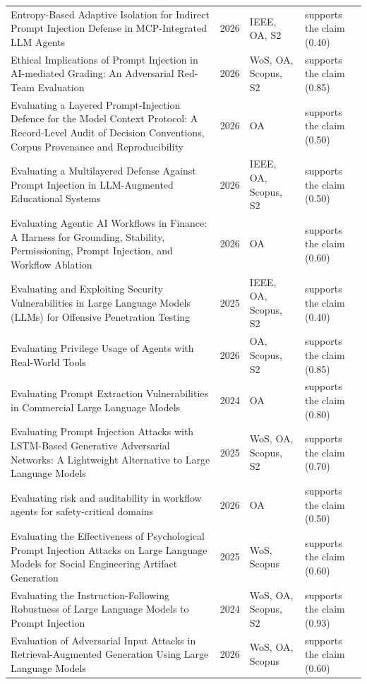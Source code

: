 \begin{longtable}{@{}%
  >{\raggedright\arraybackslash}p{}c%
  >{\raggedright\arraybackslash}p{}%
  >{\raggedright\arraybackslash}p{}@{}}
Entropy-Based Adaptive Isolation for Indirect Prompt Injection Defense in MCP-Integrated LLM Agents & 2026 & IEEE, OA, S2 & supports the claim (0.40) \\
Ethical Implications of Prompt Injection in AI-mediated Grading: An Adversarial Red-Team Evaluation & 2026 & WoS, OA, Scopus, S2 & supports the claim (0.85) \\
Evaluating a Layered Prompt-Injection Defence for the Model Context Protocol: A Record-Level Audit of Decision Conventions, Corpus Provenance and Reproducibility & 2026 & OA & supports the claim (0.50) \\
Evaluating a Multilayered Defense Against Prompt Injection in LLM-Augmented Educational Systems & 2026 & IEEE, OA, Scopus, S2 & supports the claim (0.50) \\
Evaluating Agentic AI Workflows in Finance: A Harness for Grounding, Stability, Permissioning, Prompt Injection, and Workflow Ablation & 2026 & OA & supports the claim (0.60) \\
Evaluating and Exploiting Security Vulnerabilities in Large Language Models (LLMs) for Offensive Penetration Testing & 2025 & IEEE, OA, Scopus, S2 & supports the claim (0.40) \\
Evaluating Privilege Usage of Agents with Real-World Tools & 2026 & OA, Scopus, S2 & supports the claim (0.85) \\
Evaluating Prompt Extraction Vulnerabilities in Commercial Large Language Models & 2024 & OA & supports the claim (0.80) \\
Evaluating Prompt Injection Attacks with LSTM-Based Generative Adversarial Networks: A Lightweight Alternative to Large Language Models & 2025 & WoS, OA, Scopus, S2 & supports the claim (0.70) \\
Evaluating risk and auditability in workflow agents for safety-critical domains & 2026 & OA & supports the claim (0.50) \\
Evaluating the Effectiveness of Psychological Prompt Injection Attacks on Large Language Models for Social Engineering Artifact Generation & 2025 & WoS, Scopus & supports the claim (0.60) \\
Evaluating the Instruction-Following Robustness of Large Language Models to Prompt Injection & 2024 & WoS, OA, Scopus, S2 & supports the claim (0.93) \\
Evaluation of Adversarial Input Attacks in Retrieval-Augmented Generation Using Large Language Models & 2026 & WoS, OA, Scopus & supports the claim (0.60) \\

\end{longtable}
